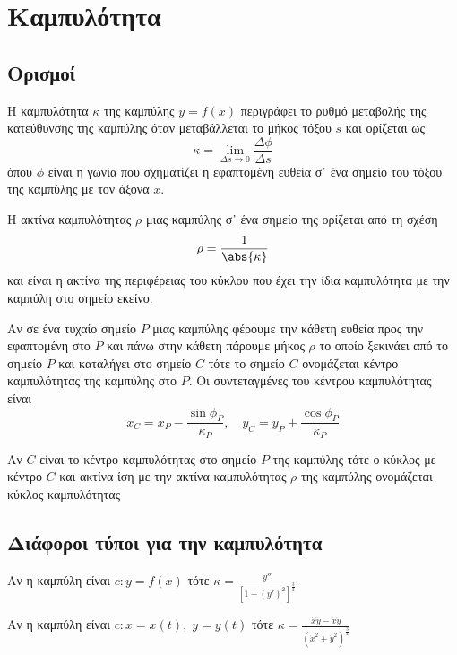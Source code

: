 



\everymath{\displaystyle}





\chapter*{Καμπυλότητα}

\section*{Ορισμοί}


\begin{dfn}
  Η \textcolor{Col2}{καμπυλότητα $\kappa$} της καμπύλης $ y = f(x) $ περιγράφει
  το ρυθμό μεταβολής της κατεύθυνσης της καμπύλης όταν μεταβάλλεται το μήκος
  τόξου $s$ και ορίζεται ως 
  \[
    \kappa = \lim_{\Delta s\to 0} \frac{\Delta \phi}{\Delta s} 
  \] 
  όπου $\phi$ είναι η γωνία που σχηματίζει η εφαπτομένη ευθεία σ᾽ ένα σημείο
  του τόξου της καμπύλης με τον άξονα $x$. 
\end{dfn}

\begin{dfn}
  Η \textcolor{Col2}{ακτίνα καμπυλότητας $\rho$} μιας καμπύλης σ᾽ ένα σημείο
  της ορίζεται από τη σχέση 
  \[
    \rho = \frac{1}{\abs{\kappa}} 
  \] 
  και είναι η ακτίνα της περιφέρειας του κύκλου που έχει την ίδια καμπυλότητα
  με την καμπύλη στο σημείο εκείνο.
\end{dfn}

\begin{dfn}
  Αν σε ένα τυχαίο σημείο $P$ μιας καμπύλης φέρουμε την κάθετη ευθεία  προς την
  εφαπτομένη στο $P$ και πάνω στην κάθετη πάρουμε μήκος $\rho$ το οποίο
  ξεκινάει από το σημείο $P$ και καταλήγει στο σημείο $C$ τότε το σημείο $C$
  ονομάζεται \textcolor{Col2}{κέντρο καμπυλότητας} της καμπύλης στο $P$.
  Οι συντεταγμένες του κέντρου καμπυλότητας είναι
  \[
    x_{C} = x_{P} - \frac{\sin{\phi_{P}}}{\kappa_{P}}, \quad y_{C} = y_{P} +
    \frac{\cos{\phi_{P}}}{\kappa_{P}} 
  \] 
\end{dfn}

\begin{dfn}
  Αν $C$ είναι το κέντρο καμπυλότητας στο σημείο $P$ της καμπύλης τότε ο
  κύκλος με κέντρο $C$ και ακτίνα ίση με την ακτίνα καμπυλότητας $\rho$ της
  καμπύλης ονομάζεται \textcolor{Col2}{κύκλος καμπυλότητας}
\end{dfn}

\section*{Διάφοροι τύποι για την καμπυλότητα}

\begin{myitemize}
  \item Αν η καμπύλη είναι $c: y = f(x) $ τότε $ \kappa = \frac{y''}{[1 + (y')^{2}]
    ^{\frac{3}{2}}} $
  \item Αν η καμπύλη είναι $ c: x = x(t), \; y = y(t) $ τότε $ \kappa =
    \frac{\dot{x}\ddot{y} - \ddot{x}\dot{y}}{(\dot{x}^{2} +
    \dot{y}^{2})^{\frac{3}{2}}}$
\end{myitemize}




